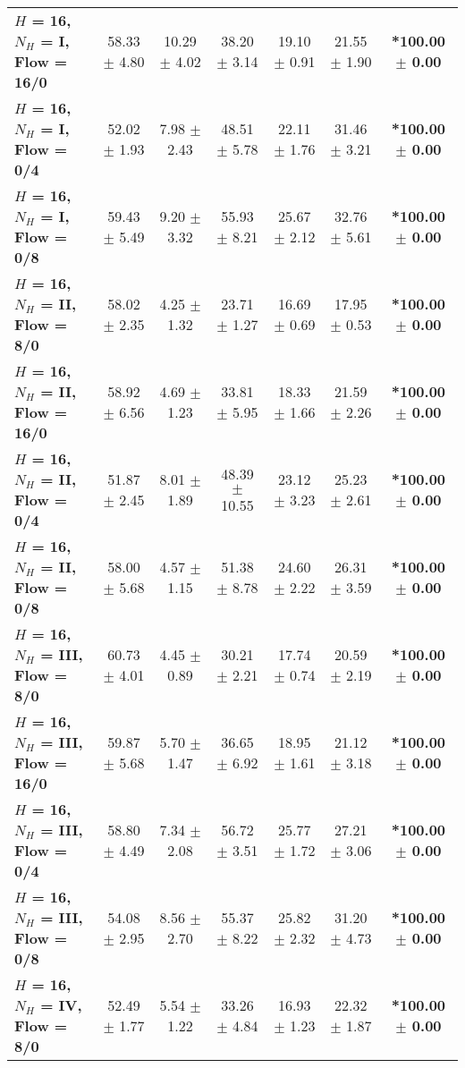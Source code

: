 \begin{table*}[ht]
{\begin{tabular}{lcccccc}
        \textbf{$H$ = 16, $N_H$ = I, Flow = 16/0} & 58.33 $\pm$ 4.80 & 10.29 $\pm$ 4.02 & 38.20 $\pm$ 3.14 & 19.10 $\pm$ 0.91 & 21.55 $\pm$ 1.90 & \textbf{*100.00 $\pm$ 0.00} \\
        \textbf{$H$ = 16, $N_H$ = I, Flow = 0/4} & 52.02 $\pm$ 1.93 & 7.98 $\pm$ 2.43 & 48.51 $\pm$ 5.78 & 22.11 $\pm$ 1.76 & 31.46 $\pm$ 3.21 & \textbf{*100.00 $\pm$ 0.00} \\
        \textbf{$H$ = 16, $N_H$ = I, Flow = 0/8} & 59.43 $\pm$ 5.49 & 9.20 $\pm$ 3.32 & 55.93 $\pm$ 8.21 & 25.67 $\pm$ 2.12 & 32.76 $\pm$ 5.61 & \textbf{*100.00 $\pm$ 0.00} \\
        \midrule
        \textbf{$H$ = 16, $N_H$ = II, Flow = 8/0} & 58.02 $\pm$ 2.35 & 4.25 $\pm$ 1.32 & 23.71 $\pm$ 1.27 & 16.69 $\pm$ 0.69 & 17.95 $\pm$ 0.53 & \textbf{*100.00 $\pm$ 0.00} \\
        \textbf{$H$ = 16, $N_H$ = II, Flow = 16/0} & 58.92 $\pm$ 6.56 & 4.69 $\pm$ 1.23 & 33.81 $\pm$ 5.95 & 18.33 $\pm$ 1.66 & 21.59 $\pm$ 2.26 & \textbf{*100.00 $\pm$ 0.00} \\
        \textbf{$H$ = 16, $N_H$ = II, Flow = 0/4} & 51.87 $\pm$ 2.45 & 8.01 $\pm$ 1.89 & 48.39 $\pm$ 10.55 & 23.12 $\pm$ 3.23 & 25.23 $\pm$ 2.61 & \textbf{*100.00 $\pm$ 0.00} \\
        \textbf{$H$ = 16, $N_H$ = II, Flow = 0/8} & 58.00 $\pm$ 5.68 & 4.57 $\pm$ 1.15 & 51.38 $\pm$ 8.78 & 24.60 $\pm$ 2.22 & 26.31 $\pm$ 3.59 & \textbf{*100.00 $\pm$ 0.00} \\
        \midrule
        \textbf{$H$ = 16, $N_H$ = III, Flow = 8/0} & 60.73 $\pm$ 4.01 & 4.45 $\pm$ 0.89 & 30.21 $\pm$ 2.21 & 17.74 $\pm$ 0.74 & 20.59 $\pm$ 2.19 & \textbf{*100.00 $\pm$ 0.00} \\
        \textbf{$H$ = 16, $N_H$ = III, Flow = 16/0} & 59.87 $\pm$ 5.68 & 5.70 $\pm$ 1.47 & 36.65 $\pm$ 6.92 & 18.95 $\pm$ 1.61 & 21.12 $\pm$ 3.18 & \textbf{*100.00 $\pm$ 0.00} \\
        \textbf{$H$ = 16, $N_H$ = III, Flow = 0/4} & 58.80 $\pm$ 4.49 & 7.34 $\pm$ 2.08 & 56.72 $\pm$ 3.51 & 25.77 $\pm$ 1.72 & 27.21 $\pm$ 3.06 & \textbf{*100.00 $\pm$ 0.00} \\
        \textbf{$H$ = 16, $N_H$ = III, Flow = 0/8} & 54.08 $\pm$ 2.95 & 8.56 $\pm$ 2.70 & 55.37 $\pm$ 8.22 & 25.82 $\pm$ 2.32 & 31.20 $\pm$ 4.73 & \textbf{*100.00 $\pm$ 0.00} \\
        \midrule
        \textbf{$H$ = 16, $N_H$ = IV, Flow = 8/0} & 52.49 $\pm$ 1.77 & 5.54 $\pm$ 1.22 & 33.26 $\pm$ 4.84 & 16.93 $\pm$ 1.23 & 22.32 $\pm$ 1.87 & \textbf{*100.00 $\pm$ 0.00} \\

\end{tabular}}
\end{table*}
